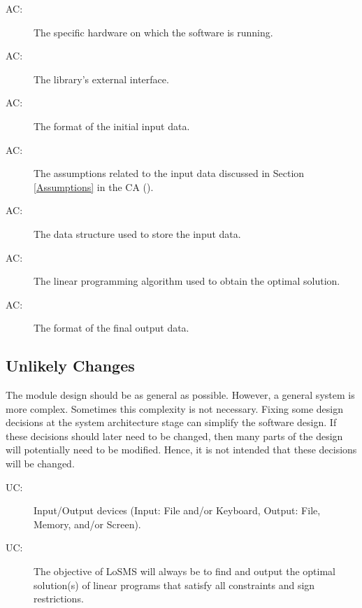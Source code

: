 \documentclass[12pt, titlepage]{article}
\newcounter{acnum}
\newcommand{\actheacnum}{AC\theacnum}
\newcounter{ucnum}
\newcommand{\uctheucnum}{UC\theucnum}
\newcommand{\famname}{LoSMS} %
\begin{document}
\begin{description}
\item[ \actheacnum \label{acHardware}:] The specific
  hardware on which the software is running.
  
\item[ \actheacnum \label{acInterface}:] The library's 
external interface.
  
\item[ \actheacnum \label{acInput}:] The format of the
  initial input data.
  
\item[ \actheacnum \label{acInputAssumption}:] The 
assumptions related to the input data discussed in Section \ref{Assumptions} in 
the CA (\cite{losms-ca}).

\item[ \actheacnum \label{acInputDataStructure}:] The 
data structure used to store the input data.

\item[ \actheacnum \label{acAlgorithm}:] The linear 
programming algorithm used to obtain the optimal solution.

\item[ \actheacnum \label{acOutput}:] The format of the 
final output data.
\end{description}

\subsection{Unlikely Changes} \label{SecUchange}

The module design should be as general as possible. However, a general system is
more complex. Sometimes this complexity is not necessary. Fixing some design
decisions at the system architecture stage can simplify the software design. If
these decisions should later need to be changed, then many parts of the design
will potentially need to be modified. Hence, it is not intended that these
decisions will be changed.

\begin{description}
\item[ \uctheucnum \label{ucIO}:] Input/Output devices
  (Input: File and/or Keyboard, Output: File, Memory, and/or Screen).

\item[ \uctheucnum \label{ucObjective}:] The objective of 
\famname{} will always be to find and output the optimal solution(s) of linear 
programs that satisfy all constraints and sign restrictions.
\end{description}
\end{document}
